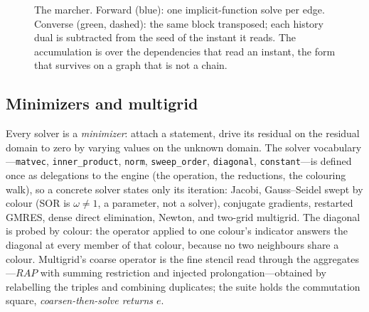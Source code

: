 \documentclass[11pt,a4paper]{article}
\newcommand{\tr}{^{\mathsf T}}
\newcommand{\code}[1]{\texttt{#1}}
\begin{document}
\begin{figure}[H]
\centering
{}
\caption{The marcher. Forward (blue): one implicit-function solve per edge. Converse (green, dashed): the same block transposed; each history dual is subtracted from the seed of the instant it reads. The accumulation is over the dependencies that read an instant, the form that survives on a graph that is not a chain.}
\label{fig:march}
\end{figure}

\subsection{Minimizers and multigrid}

Every solver is a \emph{minimizer}: attach a statement, drive its residual on the residual domain to zero by varying values on the unknown domain. The solver vocabulary---\code{matvec}, \code{inner\_product}, \code{norm}, \code{sweep\_order}, \code{diagonal}, \code{constant}---is defined once as delegations to the engine (the operation, the reductions, the colouring walk), so a concrete solver states only its iteration: Jacobi, Gauss--Seidel swept by colour (SOR is $\omega\ne1$, a parameter, not a solver), conjugate gradients, restarted GMRES, dense direct elimination, Newton, and two-grid multigrid. The diagonal is probed by colour: the operator applied to one colour's indicator answers the diagonal at every member of that colour, because no two neighbours share a colour. Multigrid's coarse operator is the fine stencil read through the aggregates---$RAP$ with summing restriction and injected prolongation---obtained by relabelling the triples and combining duplicates; the suite holds the commutation square, \emph{coarsen-then-solve returns $e$}.
\end{document}
